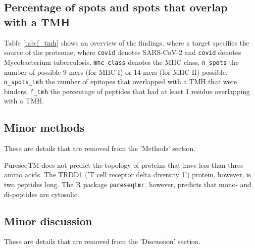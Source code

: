 \subsection{Percentage of spots and spots that overlap with a TMH}

Table \ref{tab:f_tmh} shows an overview of the findings,
where a target specifies the source of the proteome,
where \verb;covid; denotes SARS-CoV-2 and \verb;covid; denotes
Mycobacterium tuberculosis. \verb;mhc_class; denotes the MHC
class, \verb;n_spots; the number of possible 9-mers (for MHC-I) 
or 14-mers (for MHC-II) possible. \verb;n_spots_tmh; the
number of epitopes that overlapped with a TMH that were binders. 
\verb;f_tmh; the percentage of peptides that had at least 1 residue
overlapping with a TMH.



\subsection{Minor methods}

These are details that are removed from the 'Methods' section.

PureseqTM does not predict the topology
of proteins that have less than three amino acids. 
The TRDD1 ('T cell receptor delta diversity 1') protein,
however, is two peptides long. 
The R package \verb;pureseqtmr;, however, 
predicts that mono- and di-peptides are cytosolic.

\subsection{Minor discussion}

These are details that are removed from the 'Discussion' section.



